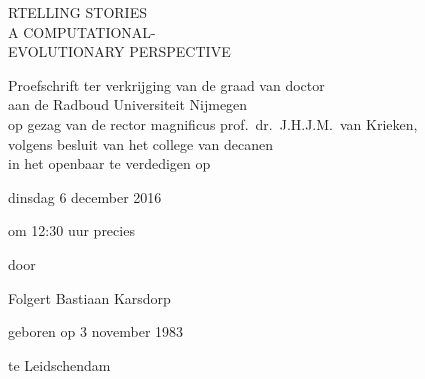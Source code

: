 

\begin{titlepage}
        \centering
        \vspace*{1cm}
        
        {\sffamily\lsstyle\LARGE RTELLING STORIES}\\\vspace{1.5cm}
        {\sffamily\lsstyle\large A COMPUTATIONAL- \vspace{0.5cm}\\EVOLUTIONARY PERSPECTIVE}\\\vspace{1.5cm}

        {Proefschrift ter verkrijging van de graad van doctor \\
         aan de Radboud Universiteit Nijmegen \\
         op gezag van de rector magnificus prof.\ dr.\ J.H.J.M.\ van Krieken, \\
         volgens besluit van het college van decanen \\
         in het openbaar te verdedigen op \\\vspace{0.5cm} }

         {dinsdag 6 december 2016} \\\vspace{0.5cm}

         {om 12:30 uur precies} \\\vspace{0.5cm}

         {door} \\\vspace{0.5cm}

         {Folgert Bastiaan Karsdorp} \\\vspace{0.5cm}

         {geboren op 3 november 1983} \\\vspace{0.5cm}

         {te Leidschendam} \\\vspace{1.5cm}
        
        \vfill           
          \thispagestyle{empty}%
          \clearpage%
\end{titlepage}